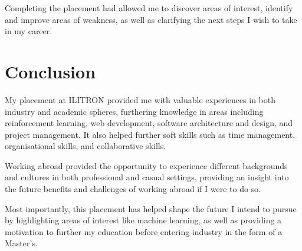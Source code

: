 \documentclass[british,12pt,a4paper]{report}
\begin{document}
Completing the placement had allowed me to discover areas of interest, identify and improve areas of
weakness, as well as clarifying the next steps I wish to take in my career.

\vfill

\tableofcontents
\listoffigures






\chapter{Conclusion}

My placement at ILITRON provided me with valuable experiences in both industry and academic spheres,
furthering knowledge in areas including reinforcement learning, web development, software
architecture and design, and project management. It also helped further soft skills such as time
management, organisational skills, and collaborative skills.

Working abroad provided the opportunity to experience different backgrounds and cultures in both
professional and casual settings, providing an insight into the future benefits and challenges of
working abroad if I were to do so.

Most importantly, this placement has helped shape the future I intend to pursue by highlighting
areas of interest like machine learning, as well as providing a motivation to further my education
before entering industry in the form of a Master's.

\printglossary[type=\acronymtype]
\printglossary[type=main]
\printbibliography
\end{document}
